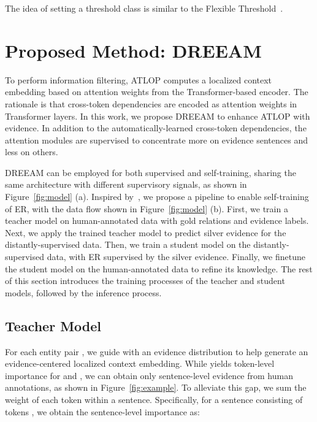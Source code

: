 \documentclass[11pt]{article}
\begin{document}
The idea of setting a threshold class is similar to the Flexible Threshold~\cite{chen-etal-2020-hierarchical}.


\section{Proposed Method: DREEAM}

\begin{figure*}
    \centering
    \hspace{.03\textwidth}
    \caption{Model architecture and the information flow during self-training. In (a), gold/silver evidence distributions come from human-annotations/the teacher model. In (b), arrows represent the direction of knowledge transfer.}
    \label{fig:model}
\end{figure*}
To perform information filtering, ATLOP computes a localized context embedding based on attention weights from the Transformer-based encoder.
The rationale is that cross-token dependencies are encoded as attention weights in Transformer layers.
In this work, we propose DREEAM to enhance ATLOP with evidence.
In addition to the automatically-learned cross-token dependencies, the attention modules are supervised to concentrate more on evidence sentences and less on others.

DREEAM can be employed for both supervised and self-training, sharing the same architecture with different supervisory signals, as shown in Figure~\ref{fig:model} (a).
Inspired by~\citet{tan-etal-2022-document}, we propose a pipeline to enable self-training of ER, with the data flow shown in Figure~\ref{fig:model} (b).
First, we train a teacher model on human-annotated data with gold relations and evidence labels.
Next, we apply the trained teacher model to predict silver evidence for the distantly-supervised data.
Then, we train a student model on the distantly-supervised data, with ER supervised by the silver evidence. 
Finally, we finetune the student model on the human-annotated data to refine its knowledge.
The rest of this section introduces the training processes of the teacher and student models, followed by the inference process.

\subsection{Teacher Model}
\label{sec:teacher}
For each entity pair , we guide  with an evidence distribution to help generate an evidence-centered localized context embedding.
While  yields token-level importance for  and , we can obtain only sentence-level evidence from human annotations, as shown in Figure~\ref{fig:example}.
To alleviate this gap, we sum the weight of each token within a sentence.
Specifically, for a sentence  consisting of tokens , we obtain the sentence-level importance as:
\end{document}
